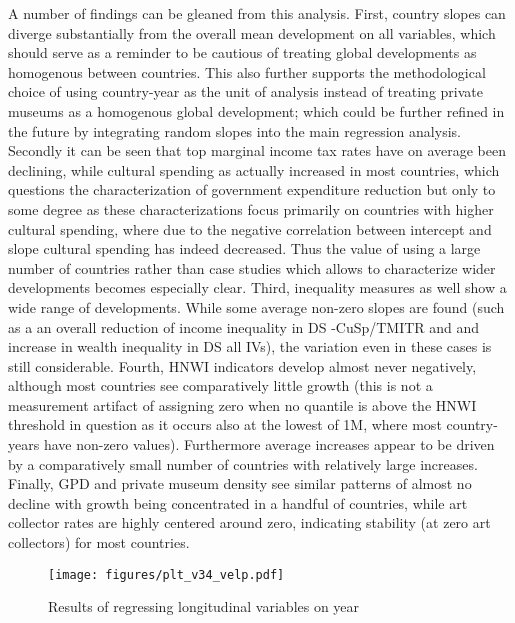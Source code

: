 \documentclass[11pt, authoryear]{elsarticle}
\begin{document}
A number of findings can be gleaned from this analysis.
First, country slopes can diverge substantially from the overall mean development on all variables, which should serve as a reminder to be cautious of treating global developments as homogenous between countries. 
This also further supports the methodological choice of using country-year as the unit of analysis instead of treating private museums as a homogenous global development; which could be further refined in the future by integrating random slopes into the main regression analysis.
Secondly it can be seen that top marginal income tax rates have on average been declining, while cultural spending as actually increased in most countries, which questions the characterization of government expenditure reduction but only to some degree as these characterizations focus primarily on countries with higher cultural spending, where due to the negative correlation between intercept and slope cultural spending has indeed decreased.
Thus the value of using a large number of countries rather than case studies which allows to characterize wider developments becomes especially clear.
Third, inequality measures as well show a wide range of developments.
While some average non-zero slopes are found (such as a an overall reduction of income inequality in DS -CuSp/TMITR and and increase in wealth inequality in DS all IVs), the variation even in these cases is still considerable. 
Fourth, HNWI indicators develop almost never negatively, although most countries see comparatively little growth (this is not a measurement artifact of assigning zero when no quantile is above the HNWI threshold in question as it occurs also at the lowest of 1M, where most country-years have non-zero values).
Furthermore average increases appear to be driven by a comparatively small number of countries with relatively large increases. 
Finally, GPD and private museum density see similar patterns of almost no decline with growth being concentrated in a handful of countries, while art collector rates are highly centered around zero, indicating stability (at zero art collectors) for most countries. 




\begin{landscape}

\begin{figure}[htbp]
\centering
\texttt{[image: figures/plt\_v34\_velp.pdf]}
\caption{\label{fig:velp}Results of regressing longitudinal variables on year}
\end{figure}

\end{landscape}




\end{document}
